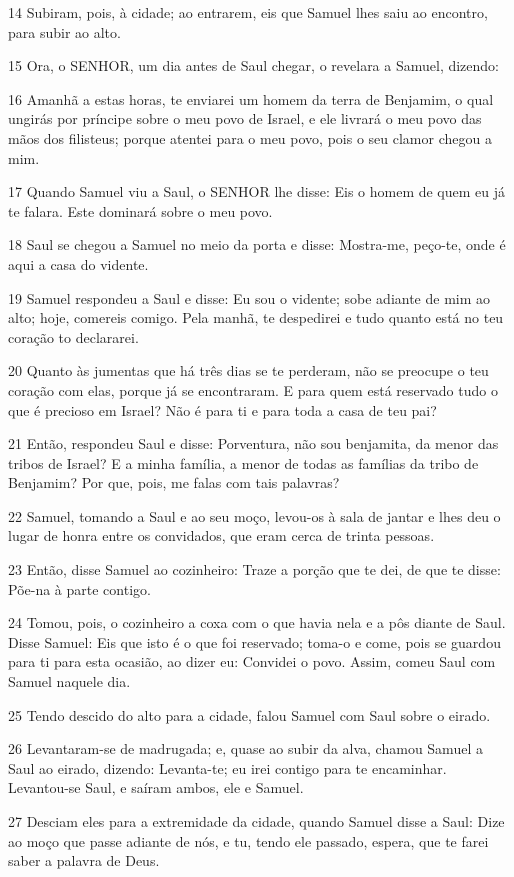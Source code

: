 \par 14 Subiram, pois, à cidade; ao entrarem, eis que Samuel lhes saiu ao encontro, para subir ao alto.
\par 15 Ora, o SENHOR, um dia antes de Saul chegar, o revelara a Samuel, dizendo:
\par 16 Amanhã a estas horas, te enviarei um homem da terra de Benjamim, o qual ungirás por príncipe sobre o meu povo de Israel, e ele livrará o meu povo das mãos dos filisteus; porque atentei para o meu povo, pois o seu clamor chegou a mim.
\par 17 Quando Samuel viu a Saul, o SENHOR lhe disse: Eis o homem de quem eu já te falara. Este dominará sobre o meu povo.
\par 18 Saul se chegou a Samuel no meio da porta e disse: Mostra-me, peço-te, onde é aqui a casa do vidente.
\par 19 Samuel respondeu a Saul e disse: Eu sou o vidente; sobe adiante de mim ao alto; hoje, comereis comigo. Pela manhã, te despedirei e tudo quanto está no teu coração to declararei.
\par 20 Quanto às jumentas que há três dias se te perderam, não se preocupe o teu coração com elas, porque já se encontraram. E para quem está reservado tudo o que é precioso em Israel? Não é para ti e para toda a casa de teu pai?
\par 21 Então, respondeu Saul e disse: Porventura, não sou benjamita, da menor das tribos de Israel? E a minha família, a menor de todas as famílias da tribo de Benjamim? Por que, pois, me falas com tais palavras?
\par 22 Samuel, tomando a Saul e ao seu moço, levou-os à sala de jantar e lhes deu o lugar de honra entre os convidados, que eram cerca de trinta pessoas.
\par 23 Então, disse Samuel ao cozinheiro: Traze a porção que te dei, de que te disse: Põe-na à parte contigo.
\par 24 Tomou, pois, o cozinheiro a coxa com o que havia nela e a pôs diante de Saul. Disse Samuel: Eis que isto é o que foi reservado; toma-o e come, pois se guardou para ti para esta ocasião, ao dizer eu: Convidei o povo. Assim, comeu Saul com Samuel naquele dia.
\par 25 Tendo descido do alto para a cidade, falou Samuel com Saul sobre o eirado.
\par 26 Levantaram-se de madrugada; e, quase ao subir da alva, chamou Samuel a Saul ao eirado, dizendo: Levanta-te; eu irei contigo para te encaminhar. Levantou-se Saul, e saíram ambos, ele e Samuel.
\par 27 Desciam eles para a extremidade da cidade, quando Samuel disse a Saul: Dize ao moço que passe adiante de nós, e tu, tendo ele passado, espera, que te farei saber a palavra de Deus.

